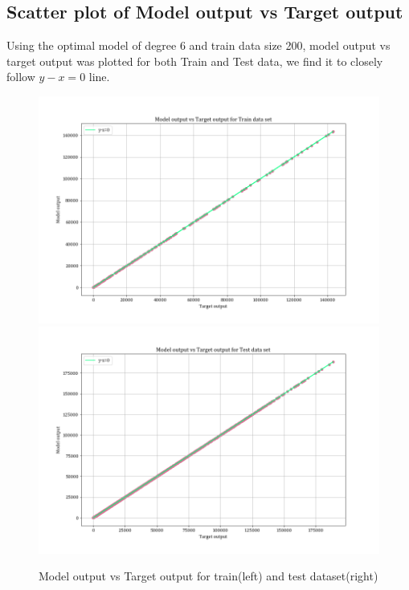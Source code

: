 \documentclass[12pt,a4paper]{article}
\begin{document}
\subsection{Scatter plot of Model output vs Target output}
Using the optimal model of degree 6 and train data size 200, model output vs target output was plotted for both Train and Test data, we find it to closely follow $y-x=0$ line.
\begin{figure}[H]
    \centering
    \includegraphics[scale=0.45]{images/tvsy_train.png}
    \includegraphics[scale=0.45]{images/tvsy_test.png}
    \caption{Model output vs Target output for train(left) and test dataset(right)}
    \label{fig:yvst}
\end{figure}


\break
\end{document}

